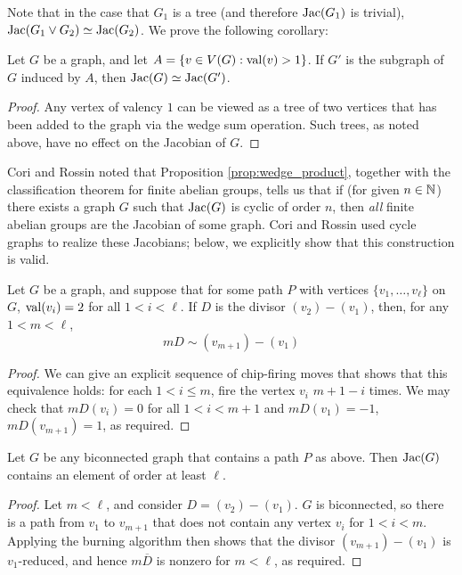 \documentclass{amsart}
\begin{document}
Note that in the case that $G_1$ is a tree (and therefore $\operatorname{Jac}(G_1)$
is trivial), $\operatorname{Jac}(G_1 \vee G_2) \simeq \operatorname{Jac}(G_2)$. We prove the
following corollary:
\begin{cor}
  \label{cor:1_valent}
  Let $G$ be a graph, and let $A = \{v \in V(G) : \operatorname{val}(v) > 1\}$. If
  $G'$ is the subgraph of $G$ induced by $A$, then $\operatorname{Jac}(G) \simeq
  \operatorname{Jac}(G')$.
\end{cor}

\begin{proof}
  Any vertex of valency $1$ can be viewed as a tree of two vertices
  that has been added to the graph via the wedge sum operation. Such
  trees, as noted above, have no effect on the Jacobian of $G$.
\end{proof}

Cori and Rossin noted that Proposition \ref{prop:wedge_product},
together with the classification theorem for finite abelian groups,
tells us that if (for given $n \in \mathbb{N}$) there exists a graph $G$ such
that $\operatorname{Jac}(G)$ is cyclic of order $n$, then \emph{all} finite abelian
groups are the Jacobian of some graph. Cori and Rossin used cycle
graphs to realize these Jacobians; below, we explicitly show that this
construction is valid.

\begin{lem}
  \label{lem:2valent_path}
  Let $G$ be a graph, and suppose that for some path $P$ with vertices
  $\{v_1, \ldots, v_\ell\}$ on $G$, $\operatorname{val}(v_i) = 2$ for all $1 < i <
  \ell$. If $D$ is the divisor $(v_2) - (v_1)$, then, for any $1 < m <
  \ell$,
  \begin{equation*}
    mD \sim (v_{m+1}) - (v_1)
  \end{equation*}
\end{lem}
\begin{proof}
  We can give an explicit sequence of chip-firing moves that shows
  that this equivalence holds: for each $1 < i \le m$, fire the vertex
  $v_i$ $m + 1 - i$ times. We may check that $mD(v_i) = 0$ for all $1
  < i < m+1$ and $mD(v_1) = -1$, $mD(v_{m+1}) = 1$, as required.
\end{proof}

\begin{cor}
  \label{cor:2valent_path}
  Let $G$ be any biconnected graph that contains a path $P$ as
  above. Then $\operatorname{Jac}(G)$ contains an element of order at least $\ell$.
\end{cor}
\begin{proof}
  Let $m < \ell$, and consider $D = (v_2) - (v_1)$. $G$ is
  biconnected, so there is a path from $v_1$ to $v_{m+1}$ that does
  not contain any vertex $v_i$ for $1 < i < m$. Applying the burning
  algorithm then shows that the divisor $(v_{m+1}) - (v_1)$ is
  $v_1$-reduced, and hence $m\overline{D}$ is nonzero for $m < \ell$,
  as required.
\end{proof}
\end{document}

